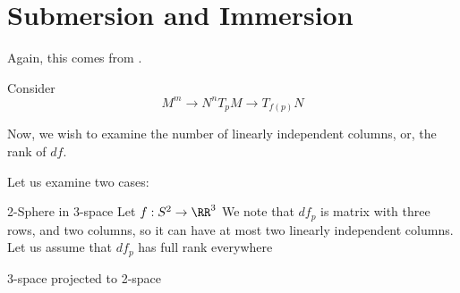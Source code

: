 \section{Submersion and Immersion}
Again, this comes from \cite{lee_2013}.


Consider 
\[ 
    M^m \to N^n
    T_pM \to T_{f(p)}N
\]

Now, we wish to examine the number of linearly independent columns, or, the rank of \( df \).

Let us examine two cases: 


\begin{boxExample}{2-Sphere in 3-space}
    Let \( f : S^2 \to \RR^3 \)
    We note that \( df_p \) is matrix with three rows, and two columns, so it can have at most two linearly independent columns.
    Let us assume that \( df_p \) has full rank everywhere
\end{boxExample}

\begin{boxExample}{3-space projected to 2-space}
\end{boxExample}
